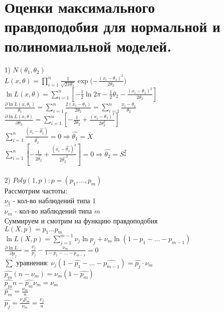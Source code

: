\documentclass{article}
\newcommand\0{\mathbb{0}}
\newcommand\1{\mathbb{1}}
\begin{document}
\section{Оценки максимального правдоподобия для нормальной и полиномиальной моделей.}
1) $N(\theta_1, \theta_2)$\\
$L(x, \theta) = \displaystyle\prod_{i = 1}^n \frac{1}{\sqrt{2\pi \theta_2}} \exp{(-\frac{(x_i - \theta_1)^2}{2\theta_2}})$\\
$\ln{L(x,\theta)} = \displaystyle\sum_{i = 1}^n [-\frac{1}{2}\ln{2\pi} - \frac{1}{2}\theta_2 - \frac{(x_i - \theta_1)^2}{2\theta_2}]$\\
$\frac{\partial\ln{L(x, \theta_1)}}{\theta_1} = \displaystyle\sum_{i = 1}^n\frac{2(x_i - \theta_1)}{2\theta_2} = \displaystyle\sum_{i = 1}^n\frac{x_i - \theta_1}{\theta_2}$\\
$\frac{\partial\ln{L(x, \theta)}}{\partial \theta_2} = \displaystyle\sum_{i = 1}^n[-\frac{1}{2\theta_2} + \frac{(x_i - \theta_1)^2}{2\theta_2^2}]$\\
$\displaystyle\sum_{i = 1}^n \frac{(x_i - \widehat{\theta_1})}{\widehat{\theta_2}} = 0 \Rightarrow \widehat{\theta_1} = \overline{X}$\\
$\displaystyle\sum_{i = 1}^n [-\frac{1}{2\widehat{\theta_2}} + \frac{(x_i - \widehat{\theta_1})^2}{2\widehat{\theta_2}^2}] = 0 \Rightarrow \widehat{\theta_2} = S_*^2$\\
\\
2) $Poly(1, p): p = (p_1, \dots, p_m)$\\
Рассмотрим частоты:\\
$\nu_1$ - кол-во наблюдений типа 1\\
$\dots$\\
$\nu_m$ - кол-во наблюдений типа $m$\\
Суммируем и смотрим на функцию правдоподобия\\
$L(X, p) = p_1 \dots p_m$\\
$\ln{L(X, p)} = \displaystyle\sum_{j = 1}^{m - 1}\nu_j \ln{p_j} + \nu_m \ln{(1 - p_1 - \dots - p_{m - 1})}$\\
$\frac{\partial \ln{L\dots}}{\partial p_j} = \frac{\nu_j}{p_j} - \frac{\nu_m}{1 - p_1 - \dots - p_{m - 1}} = 0$\\
$\displaystyle\sum$ уравнения: $\nu_j(1 - \widehat{p_1} - \dots - \widehat{p_{m - 1}}) = \widehat{p_j} \cdot \nu_m$\\
$\widehat{p_m}(n - \nu_m) = \nu_m (1 - \widehat{p_m})$\\
$\widehat{p_m}n - \widehat{p_m}\nu_m = \nu_m$\\
$\widehat{p_m} = \frac{\nu_m}{n}$\\
$\widehat{p_j} = \frac{\nu_j \widehat{p_m}}{\nu_m} = \frac{\nu_j}{n}$
\end{document}
